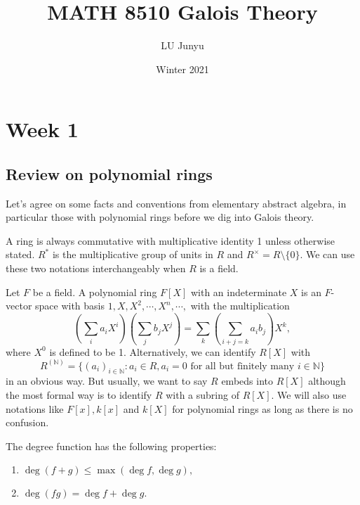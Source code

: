 \documentclass[12pt]{report}
\theoremstyle{definition}
\def\NN{\mathbb{N}}
\begin{document}
\title{MATH 8510 Galois Theory}
\author{LU Junyu}
\date{Winter 2021}


\maketitle

\tableofcontents

\chapter*{Week 1}
\setcounter{chapter}{1}
\section{Review on polynomial rings}

Let's agree on some facts and conventions from elementary abstract algebra, in particular those with polynomial rings before we dig into Galois theory.

\smallskip

A ring is always commutative with multiplicative identity 1 unless otherwise stated. $R^*$ is the multiplicative group of units in $R$ and $R^\times = R\setminus \{0\}$. We can use these two notations interchangeably when $R$ is a field.

\smallskip

Let $F$ be a field. A polynomial ring $F[X]$ with an indeterminate $X$ is an $F$-vector space with basis $1,X,X^2,\cdots,X^n,\cdots,$ with the multiplication $$(\sum_i a_iX^i)(\sum_j b_j X^j) =  \sum_k (\sum_{i+j=k}a_ib_j)X^k,$$ where $X^0$ is defined to be 1. Alternatively, we can identify $R[X]$ with $$R^{(\NN)}=\{(a_i)_{i\in\NN}: a_i\in R, a_i=0 \mbox{ for all but finitely many }i\in\NN\}$$ in an obvious way. But usually, we want to say $R$ embeds into $R[X]$ although the most formal way is to identify $R$ with a subring of $R[X]$.  We will also use notations like $F[x], k[x]$ and $k[X]$ for polynomial rings as long as there is no confusion.

The degree function has the following properties:
\begin{enumerate}
    \item $\deg(f+g) \leq \max(\deg f,\deg g),$
    \item $\deg(fg)=\deg f+\deg g.$
\end{enumerate}
\end{document}
